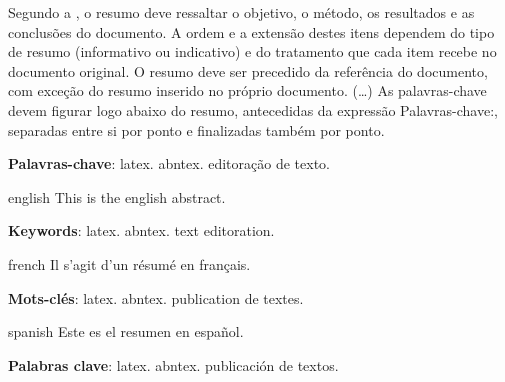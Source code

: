 \setlength{\absparsep}{18pt} %
\begin{resumo}
 Segundo a , o resumo deve ressaltar o
 objetivo, o método, os resultados e as conclusões do documento. A ordem e a extensão
 destes itens dependem do tipo de resumo (informativo ou indicativo) e do
 tratamento que cada item recebe no documento original. O resumo deve ser
 precedido da referência do documento, com exceção do resumo inserido no
 próprio documento. (\ldots) As palavras-chave devem figurar logo abaixo do
 resumo, antecedidas da expressão Palavras-chave:, separadas entre si por
 ponto e finalizadas também por ponto.

 

 \textbf{Palavras-chave}: latex. abntex. editoração de texto.
\end{resumo}

\begin{resumo}[Abstract]
 \begin{otherlanguage*}{english}
   This is the english abstract.

   \vspace{\onelineskip}
 
   \noindent 
   \textbf{Keywords}: latex. abntex. text editoration.
 \end{otherlanguage*}
\end{resumo}

\begin{resumo}[Résumé]
 \begin{otherlanguage*}{french}
    Il s'agit d'un résumé en français.
 
   \textbf{Mots-clés}: latex. abntex. publication de textes.
 \end{otherlanguage*}
\end{resumo}

\begin{resumo}[Resumen]
 \begin{otherlanguage*}{spanish}
   Este es el resumen en español.
  
   \textbf{Palabras clave}: latex. abntex. publicación de textos.
 \end{otherlanguage*}
\end{resumo}
